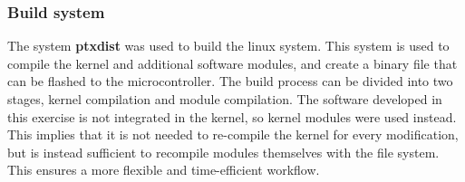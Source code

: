 \subsubsection{Build system}
The system {\bf ptxdist} was used to build the linux system. This system is used to compile the kernel and additional software modules, and create a binary file that can be flashed to the microcontroller. The build process can be divided into two stages, kernel compilation and module compilation. The software developed in this exercise is not integrated in the kernel, so kernel modules were used instead. This implies that it is not needed to re-compile the kernel for every modification, but is instead sufficient to recompile modules themselves with the file system. This ensures a more flexible and time-efficient workflow.



 